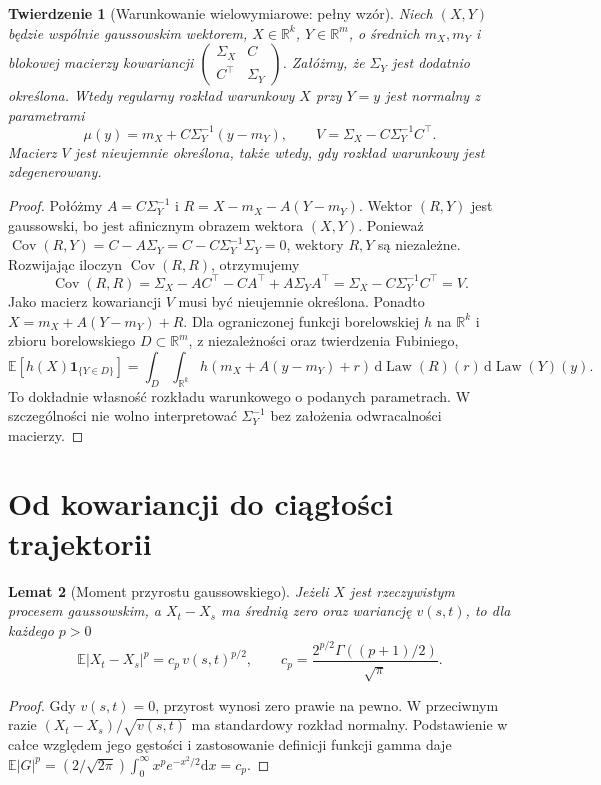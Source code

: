 \documentclass[11pt,a4paper,oneside]{report}
\numberwithin{equation}{chapter}
\theoremstyle{plain}
\newtheorem{twierdzenie}{Twierdzenie}[chapter]
\newtheorem{lemat}[twierdzenie]{Lemat}
\theoremstyle{definition}
\theoremstyle{remark}
\newcommand{\R}{\mathbb{R}}
\newcommand{\E}{\mathbb{E}}
\newcommand{\Cov}{\operatorname{Cov}}
\newcommand{\Law}{\operatorname{Law}}
\newcommand{\ind}[1]{\mathbf{1}_{#1}}
\newcommand{\dd}{\mathrm{d}}
\begin{document}
\begin{twierdzenie}[Warunkowanie wielowymiarowe: pełny wzór]
Niech $(X,Y)$ będzie wspólnie gaussowskim wektorem,
$X\in\R^k$, $Y\in\R^m$, o średnich $m_X,m_Y$ i blokowej
macierzy kowariancji
$\left(\begin{smallmatrix}\Sigma_X&C\\ C^\top&\Sigma_Y\end{smallmatrix}\right)$.
Załóżmy, że $\Sigma_Y$ jest dodatnio określona.
Wtedy regularny rozkład warunkowy $X$ przy $Y=y$ jest
normalny z parametrami
\[
\mu(y)=m_X+C\Sigma_Y^{-1}(y-m_Y),\qquad
V=\Sigma_X-C\Sigma_Y^{-1}C^\top.
\]
Macierz $V$ jest nieujemnie określona, także wtedy,
gdy rozkład warunkowy jest zdegenerowany.
\end{twierdzenie}
\begin{proof}
Połóżmy $A=C\Sigma_Y^{-1}$ i
$R=X-m_X-A(Y-m_Y)$. Wektor $(R,Y)$ jest gaussowski,
bo jest afinicznym obrazem wektora $(X,Y)$.
Ponieważ
$\Cov(R,Y)=C-A\Sigma_Y=C-C\Sigma_Y^{-1}\Sigma_Y=0$,
wektory $R,Y$ są niezależne. Rozwijając iloczyn
$\Cov(R,R)$, otrzymujemy
\[
\Cov(R,R)=\Sigma_X-AC^\top-CA^\top+A\Sigma_YA^\top
=\Sigma_X-C\Sigma_Y^{-1}C^\top=V.
\]
Jako macierz kowariancji $V$ musi być nieujemnie określona.
Ponadto $X=m_X+A(Y-m_Y)+R$. Dla ograniczonej funkcji
borelowskiej $h$ na $\R^k$ i zbioru borelowskiego
$D\subset\R^m$, z niezależności oraz twierdzenia Fubiniego,
\[
\E[h(X)\ind{\{Y\in D\}}]
=\int_D\int_{\R^k}h(m_X+A(y-m_Y)+r)
\,\dd\Law(R)(r)\,\dd\Law(Y)(y).
\]
To dokładnie własność rozkładu warunkowego o podanych
parametrach. W szczególności nie wolno interpretować
$\Sigma_Y^{-1}$ bez założenia odwracalności macierzy.
\end{proof}

\section{Od kowariancji do ciągłości trajektorii}
\begin{lemat}[Moment przyrostu gaussowskiego]
Jeżeli $X$ jest rzeczywistym procesem gaussowskim,
a $X_t-X_s$ ma średnią zero oraz wariancję $v(s,t)$,
to dla każdego $p>0$
\[
\E|X_t-X_s|^p=c_p\,v(s,t)^{p/2},\qquad
c_p=\frac{2^{p/2}\Gamma((p+1)/2)}{\sqrt\pi}.
\]
\end{lemat}
\begin{proof}
Gdy $v(s,t)=0$, przyrost wynosi zero prawie na pewno.
W przeciwnym razie $(X_t-X_s)/\sqrt{v(s,t)}$ ma standardowy
rozkład normalny. Podstawienie w całce względem jego gęstości
i zastosowanie definicji funkcji gamma daje
$\E|G|^p=(2/\sqrt{2\pi})\int_0^\infty
 x^p e^{-x^2/2}\dd x=c_p$.
\end{proof}
\end{document}

